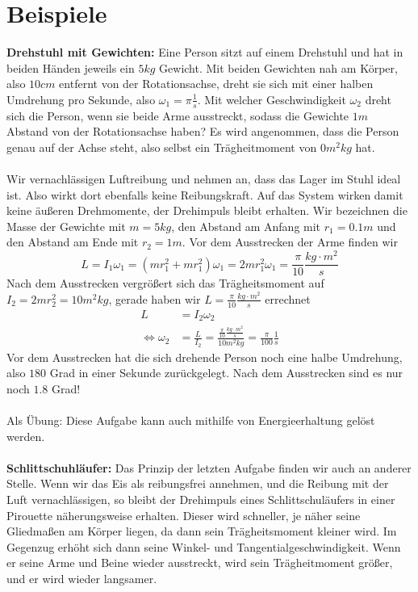 \documentclass[11pt]{article}
\begin{document}
\section{Beispiele}
\textbf{Drehstuhl mit Gewichten:} Eine Person sitzt auf einem Drehstuhl und hat in beiden Händen jeweils ein $5kg$ Gewicht. Mit beiden Gewichten nah am Körper, also $10cm$ entfernt von der Rotationsachse, dreht sie sich mit einer halben Umdrehung pro Sekunde, also $\omega_1 = \pi \frac{1}{s}$. Mit welcher Geschwindigkeit $\omega_2$ dreht sich die Person, wenn sie beide Arme ausstreckt, sodass die Gewichte $1m$ Abstand von der Rotationsachse haben? Es wird angenommen, dass die Person genau auf der Achse steht, also selbst ein Trägheitmoment von $0 m^2kg$ hat. \\\\ 
Wir vernachlässigen Luftreibung und nehmen an, dass das Lager im Stuhl ideal ist. Also wirkt dort ebenfalls keine Reibungskraft. Auf das System wirken damit keine äußeren Drehmomente, der Drehimpuls bleibt erhalten. Wir bezeichnen die Masse der Gewichte mit $m = 5kg$, den Abstand am Anfang mit $r_1 = 0.1m$ und den Abstand am Ende mit $r_2 = 1m$. Vor dem Ausstrecken der Arme finden wir 
\begin{equation*}
        L = I_1\omega_1 = (mr_1^2 + mr_1^2)\omega_1 = 2mr_1^2\omega_1 = \frac{\pi}{10} \frac{kg\cdot m^2}{s}
\end{equation*}
Nach dem Ausstrecken vergrößert sich das Trägheitsmoment auf $I_2 = 2mr_2^2 = 10 m^2kg$, gerade haben wir $L = \frac{\pi}{10} \frac{kg\cdot m^2}{s}$ errechnet
\begin{align*}
        L &= I_2\omega_2 \\
        \iff \omega_2 &= \frac{L}{I_2} = \frac{\frac{\pi}{10} \frac{kg\cdot m^2}{s}}{10 m^2kg} = \frac{\pi}{100} \frac{1}{s}
\end{align*}
Vor dem Ausstrecken hat die sich drehende Person noch eine halbe Umdrehung, also $180$ Grad in einer Sekunde zurückgelegt. Nach dem Ausstrecken sind es nur noch $1.8$ Grad! \\\\
Als Übung: Diese Aufgabe kann auch mithilfe von Energieerhaltung gelöst werden. \\\\
\textbf{Schlittschuhläufer:} Das Prinzip der letzten Aufgabe finden wir auch an anderer Stelle. Wenn wir das Eis als reibungsfrei annehmen, und die Reibung mit der Luft vernachlässigen, so bleibt der Drehimpuls eines Schlittschuläufers in einer Pirouette näherungsweise erhalten. Dieser wird schneller, je näher seine Gliedmaßen am Körper liegen, da dann sein Trägheitsmoment kleiner wird. Im Gegenzug erhöht sich dann seine Winkel- und Tangentialgeschwindigkeit. Wenn er seine Arme und Beine wieder ausstreckt, wird sein Trägheitmoment größer, und er wird wieder langsamer. \\\\
\end{document}
